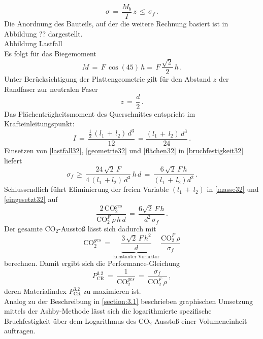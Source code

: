 \begin{equation}\label{bruchfestigkeit32}
\sigma\,=\,\frac{M_b}{I}\,z\,\le\,\sigma_f\,.
\end{equation}
Die Anordnung des Bauteils, auf der die weitere Rechnung basiert ist in Abbildung ?? dargestellt. \\
Abbildung Lastfall\\
Es folgt für das Biegemoment
\begin{equation}\label{lastfall32}
M\,=\,F\,\cos(45)\,h=\,F\,\frac{\sqrt{2}}{2}\,h\,.
\end{equation}
Unter Berücksichtigung der Plattengeometrie gilt für den Abstand $z$ der Randfaser zur neutralen Faser
\begin{equation}\label{geometrie32}
z\,=\,\frac{d}{2}\,.
\end{equation}
Das Flächenträgheitsmoment des Querschnittes entspricht im Krafteinleitungspunkt:
\begin{equation}\label{flächen32}
I\,=\,\frac{\frac{1}{2}\,(l_1\,+\,l_2)\,d^3}{12}\,=\frac{(l_1\,+\,l_2)\,d^3}{24}\,.
\end{equation}
Einsetzen von \ref{lastfall32}, \ref{geometrie32} und \ref{flächen32} in \ref{bruchfestigkeit32} liefert
\begin{equation}\label{eingesetzt32}
\sigma_f\,\ge\,\frac{24\,\sqrt{2}\,F}{4\,(l_1\,+l_2)\,d^3}\,h\,d\,=\,\frac{6\,\sqrt{2}\,F\,h}{(l_1\,+\,l_2)d^2}\,.
\end{equation}
Schlussendlich führt Eliminierung der freien Variable $(l_1\,+\,l_2)$ in \ref{masse32} und \ref{eingesetzt32} auf
\begin{equation}
\frac{2\,\text{CO}_2^{ges}}{\text{CO}_2^F\,\rho\,h\,d}\,=\,\frac{6\sqrt{2}\,F\,h}{d^2\,\sigma_f}\,.
\end{equation}
Der gesamte CO$_2$-Ausstoß lässt sich dadurch mit
\begin{equation}
\text{CO}_2^{ges}\,=\,\underbrace{\frac{3\,\sqrt{2}\,F\,h^2}{d}}_{\text{konstanter Vorfaktor}}\,\frac{\text{CO}_2^F\,\rho}{\sigma_f}
\end{equation}
berechnen.
Damit ergibt sich die Performance-Gleichung
\begin{equation} \label{zielfkt32}
P_{\text{CR}}^{3.2}\,=\,\frac{1}{\text{CO}_2^{ges}}\,=\,\frac{\sigma_f}{\text{CO}_2^F\,\rho}\,,
\end{equation}
deren Materialindex $P_{\text{CR}}^{3.2}$ zu maximieren ist.\\
Analog zu der Beschreibung in \ref{section:3.1} beschrieben graphischen Umsetzung mittels der Ashby-Methode lässt sich die logarithmierte spezifische Bruchfestigkeit über dem Logarithmus des CO$_2$-Ausstoß einer Volumeneinheit auftragen.\\
